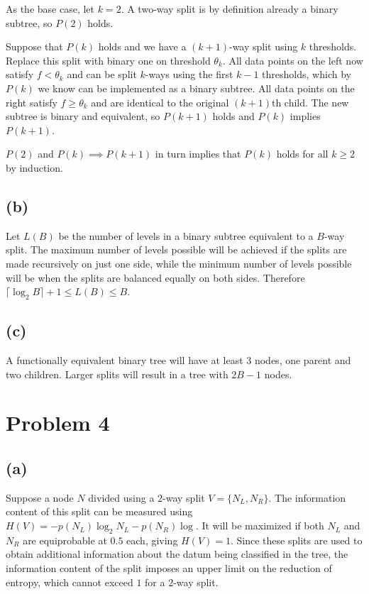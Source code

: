 \documentclass[12pt]{article}
\begin{document}
	As the base case, let $k=2$. A two-way split is by definition already a binary subtree, so $P(2)$ holds.
	
	Suppose that $P(k)$ holds and we have a $(k+1)$-way split using $k$ thresholds. Replace this split with binary one on threshold $\theta_k$. All data points on the left now satisfy $f < \theta_k$ and can be split $k$-ways using the first $k-1$ thresholds, which by $P(k)$ we know can be implemented as a binary subtree. All data points on the right satisfy $f \geq \theta_k$ and are identical to the original $(k+1)$th child. The new subtree is binary and equivalent, so $P(k+1)$ holds and $P(k)$ implies $P(k+1)$.
	
	$P(2)$ and $P(k) \implies P(k+1)$ in turn implies that $P(k)$ holds for all $k \geq 2$ by induction.
	
	\subsection*{(b)}
	Let $L(B)$ be the number of levels in a binary subtree equivalent to a $B$-way split. The maximum number of levels possible will be achieved if the splits are made recursively on just one side, while the minimum number of levels possible will be when the splits are balanced equally on both sides. Therefore $\lceil \log_2B \rceil + 1 \leq L(B) \leq B$.
	
	\subsection*{(c)}
	A functionally equivalent binary tree will have at least $3$ nodes, one parent and two children. Larger splits will result in a tree with $2B-1$ nodes.
	
\section*{Problem 4}
	\subsection*{(a)}
	Suppose a node $N$ divided using a $2$-way split $V=\{N_L,N_R\}$. The information content of this split can be measured using $H(V)=-p(N_L)\log_2N_L-p(N_R)\log$. It will be maximized if both $N_L$ and $N_R$ are equiprobable at $0.5$ each, giving $H(V) = 1$. Since these splits are used to obtain additional information about the datum being classified in the tree, the information content of the split imposes an upper limit on the reduction of entropy, which cannot exceed $1$ for a $2$-way split.
	
\end{document}
